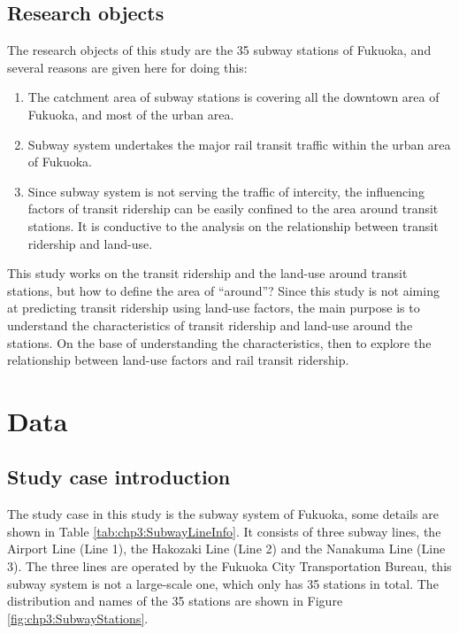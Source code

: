 %
\subsection{Research objects}
%
The research objects of this study are the 35 subway stations of Fukuoka, and several reasons are given here for doing this:

%
\begin{enumerate}
	\setlength{\parskip}{0\baselineskip} %
	\item The catchment area of subway stations is covering all the downtown area of Fukuoka, and most of the urban area. 
	\item Subway system undertakes the major rail transit traffic within the urban area of Fukuoka. 
	\item Since subway system is not serving the traffic of intercity, the influencing factors of transit ridership can be easily confined to the area around transit stations. It is conductive to the analysis on the relationship between transit ridership and land-use.
	\setlength{\parskip}{0.7\baselineskip} %
\end{enumerate}

%
This study works on the transit ridership and the land-use around transit stations, but how to define the area of “around”? Since this study is not aiming at predicting transit ridership using land-use factors, the main purpose is to understand the characteristics of transit ridership and land-use around the stations. On the base of understanding the characteristics, then to explore the relationship between land-use factors and rail transit ridership.



%
\section{Data}
\subsection{Study case introduction}
%
The study case in this study is the subway system of Fukuoka, some details are shown in Table \ref{tab:chp3:SubwayLineInfo}. It consists of three subway lines, the Airport Line (Line 1), the Hakozaki Line (Line 2) and the Nanakuma Line (Line 3). The three lines are operated by the Fukuoka City Transportation Bureau, this subway system is not a large-scale one, which only has 35 stations in total. The distribution and names of the 35 stations are shown in Figure \ref{fig:chp3:SubwayStations}.

